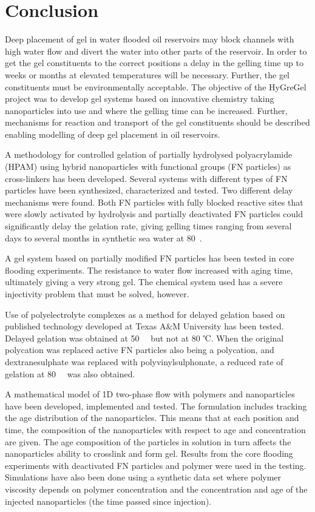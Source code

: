 \documentclass[journal = enfuem, manuscript =  article]{achemso}
\begin{document}
\section{Conclusion}
Deep placement of gel in water flooded oil reservoirs may block channels with high water flow and divert the water into other parts of the reservoir. In order to get the gel constituents to the correct positions a delay in the gelling time up to weeks or months at elevated temperatures will be necessary. Further, the gel constituents must be environmentally acceptable. The objective of the HyGreGel project was to develop gel systems based on innovative chemistry taking nanoparticles into use and where the gelling time can be increased. Further, mechanisms for reaction and transport of the gel constituents should be described enabling modelling of deep gel placement in oil reservoirs.

A methodology for controlled gelation of partially hydrolysed polyacrylamide (HPAM) using hybrid nanoparticles with functional groups (FN particles) as cross-linkers has been developed. Several systems with different types of FN particles have been synthesized, characterized and tested. Two different delay mechanisms were found.  Both FN particles with fully blocked reactive sites that were slowly activated by hydrolysis and partially deactivated FN particles could significantly delay the gelation rate, giving gelling times ranging from several days to several months in synthetic sea water at 80~\celsius.

A gel system based on partially modified FN particles has been tested in core flooding experiments. The resistance to water flow increased with aging time, ultimately giving a very strong gel. The chemical system used has a severe injectivity problem that must be solved, however.    

Use of polyelectrolyte complexes as a method for delayed gelation based on published
technology developed at Texas A\&M University has been tested. Delayed gelation was obtained at 50~\celsius~ but not at 80 ℃. When the original polycation was replaced  
active FN particles also being a polycation, and dextranesulphate was replaced with polyvinylsulphonate, a reduced rate of gelation at 80~\celsius~ was also obtained.  

A mathematical model of 1D two-phase flow with polymers and nanoparticles have been developed, implemented and tested. The formulation includes tracking the age distribution of the nanoparticles. This means that at each position and time, the composition of the nanoparticles with respect to age and concentration are given. The age composition of the particles in solution in turn affects the nanoparticles ability to crosslink and form gel. Results from the core flooding experiments with deactivated FN particles and polymer were used in the testing. Simulations have also been done using a synthetic data set where polymer viscosity depends on polymer concentration and the concentration and age of the injected nanoparticles (the time passed since injection).
\end{document}
